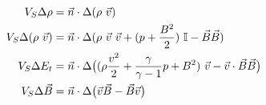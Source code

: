 \begin{equation}
\label{eq:MHD-shock-conditions}
\begin{split}
V_S \Delta \rho &= \vec{n}\cdot\Delta(\rho \ \vec{v})\\
V_S \Delta (\rho \ \vec{v}) &= \vec{n} \cdot \Delta(\rho \ \vec{v} \ \vec{v} + (p + \frac{B^2}{2}) \ \I -  \vec{B}\vec{B}) \\
V_S \Delta E_t &= \vec{n} \cdot \Delta \big( (\rho \frac{v^2}{2} + \frac{\gamma}{\gamma - 1} p + B^2) \ \vec{v} - \vec{v} \cdot \vec{B} \vec{B} \big) \\
V_S \Delta \vec{B} &= \vec{n} \cdot \Delta \big( \vec{v} \vec{B} - \vec{B} \vec{v} \big)
\end{split}
\end{equation}